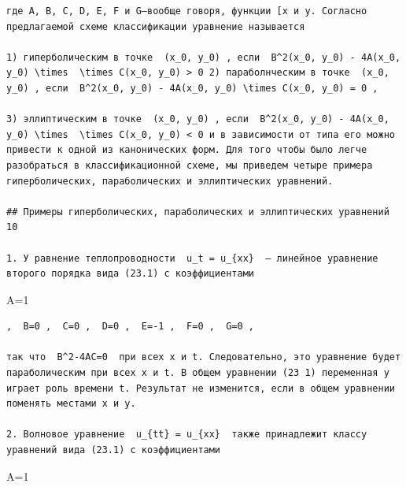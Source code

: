\documentclass[
  ukrainian,
]{article}
\begin{document}
\begin{verbatim}
где A, B, C, D, E, F и G—вообще говоря, функции [x и y. Согласно предлагаемой схеме классификации уравнение называется

1) гиперболическим в точке  (x_0, y_0) , если  B^2(x_0, y_0) - 4A(x_0, y_0) \times  \times C(x_0, y_0) > 0 2) параболнческим в точке  (x_0, y_0) , если  B^2(x_0, y_0) - 4A(x_0, y_0) \times C(x_0, y_0) = 0 ,

3) эллиптическим в точке  (x_0, y_0) , если  B^2(x_0, y_0) - 4A(x_0, y_0) \times  \times C(x_0, y_0) < 0 и в зависимости от типа его можно привести к одной из канонических форм. Для того чтобы было легче разобраться в классификационной схеме, мы приведем четыре примера гиперболических, параболических и эллиптических уравнений.

## Примеры гиперболических, параболических и эллиптических уравнений 10

1. У равнение теплопроводности  u_t = u_{xx}  — линейное уравнение второго порядка вида (23.1) с коэффициентами
\end{verbatim}

A=1

\begin{verbatim}
,  B=0 ,  C=0 ,  D=0 ,  E=-1 ,  F=0 ,  G=0 ,

так что  B^2-4AC=0  при всех x и t. Следовательно, это уравнение будет параболическим при всех x и t. В общем уравнении (23 1) переменная y играет роль времени t. Результат не изменится, если в общем уравнении поменять местами x и y.

2. Волновое уравнение  u_{tt} = u_{xx}  также принадлежит классу уравнений вида (23.1) с коэффициентами
\end{verbatim}

A=1
\end{document}

